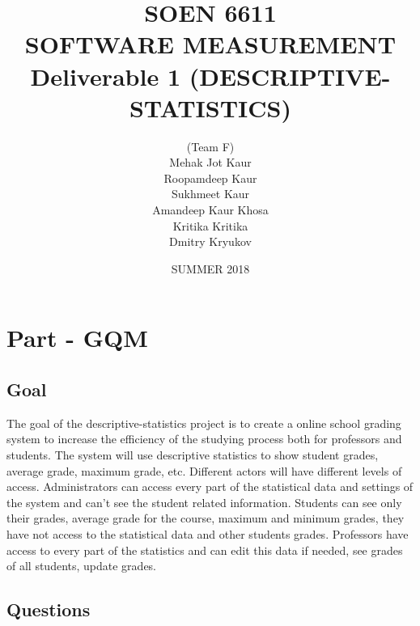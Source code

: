 \documentclass[12pt]{article}
\title{SOEN 6611 \\ SOFTWARE MEASUREMENT \\ Deliverable 1
(DESCRIPTIVE-STATISTICS)}
\date{SUMMER 2018}
\author{(Team F)\\ 
Mehak Jot Kaur\\
Roopamdeep Kaur\\
Sukhmeet Kaur\\
Amandeep Kaur Khosa\\
Kritika Kritika\\
Dmitry Kryukov
}
\begin{document}
            
\maketitle                  
\newpage
\section{Part - GQM}      
\subsection{Goal}

The goal of the descriptive-statistics project is to create a online school grading system to increase the efficiency of the studying process both for professors and students. The system will use descriptive statistics to show student grades, average grade, maximum grade, etc. Different actors will have different levels of access. Administrators can access every part of the statistical data and settings of the system and can't see the student related information. Students can see only their grades, average grade for the course, maximum and minimum grades, they have not access to the statistical data and other students grades. Professors have access to every part of the statistics and can edit this data if needed, see grades of all students, update grades.\cite{GQM} \cite{GQM-approach} \cite{GQM-wiki}

\subsection{Questions}
\end{document}
